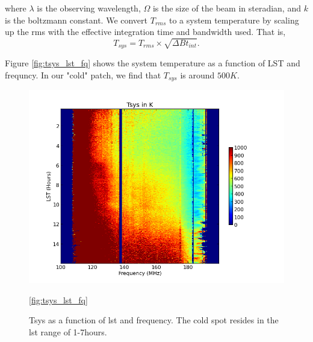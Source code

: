 \documentclass[twocolumn,numberedappendix]{emulateapj}
\begin{document}
where $\lambda$ is the observing wavelength, $\Omega$ is the size of the beam in
steradian, and $k$ is the boltzmann constant. We convert $T_{rms}$ to a system
temperature by scaling up the rms with the effective integration time and
bandwidth used. That is, 
\begin{equation}
    T_{sys} = T_{rms} \times \sqrt{\Delta{B}t_{int}}.
\end{equation}

Figure \ref{fig:tsys_lst_fq} shows the system temperature as a function of
LST and frequncy. In our "cold" patch, we find that $T_{sys}$ is around $500K$.


\begin{figure}
\centering
\includegraphics[width=\columnwidth]{plots/tsys_lst_freq.png}
\caption{Tsys as a function of lst and frequency. The cold spot resides in the
lst range of 1-7hours.}
\ref{fig:tsys_lst_fq}
\end{figure}
\end{document}
